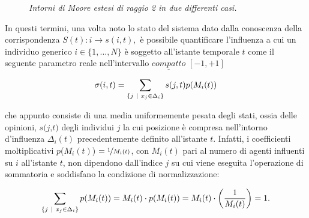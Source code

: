 \documentclass{article}
\begin{document}
\begin{figure}[h]
\centering
{}
\caption{\textit{Intorni di Moore estesi di raggio 2 in due differenti casi.}}
\label{fig:3}
\end{figure}

In questi termini, una volta noto lo stato del sistema dato dalla conoscenza della corrispondenza $S(t): i \rightarrow s(i,t), $ è possibile quantificare l'influenza a cui un individuo generico $\textit{i} \in \{1,...,\textit{N} \}$ è soggetto all'istante temporale $\textit{t}$ come il seguente parametro reale nell'intervallo $\underline{compatto}$ $[-1,+1]$

\begin{equation}
    \sigma(i,t) = \sum_{ \{ j \ | \ x_{j} \in \Delta_{i} \} } s(j, t)p(M_{i}(t))
    \medskip
    \label{Eq:1}
\end{equation}

che appunto consiste di una media uniformemente pesata degli stati, ossia delle opinioni, $\textit{s(j,t)}$ degli individui $\textit{j}$ la cui posizione è compresa nell'intorno d'influenza $\Delta_{i}(t)$ precedentemente definito all'istante $\textit{t}$. Infatti, i coefficienti moltiplicativi $\textit{p}$($M_{i}(t)$) $= \nicefrac{1}{M_{i}(t)}$, con $M_{i}(t)$ pari al numero di agenti influenti su $\textit{i}$ all'istante $\textit{t}$, non dipendono dall'indice $\textit{j}$ su cui viene eseguita l'operazione di sommatoria e soddisfano la condizione di normalizzazione:

\begin{equation}
    \sum_{ \{ j \ | \ x_{j} \in \Delta_{i} \} } p(M_{i}(t)) = M_{i}(t) \cdot p(M_{i}(t)) =    M_{i}(t) \cdot \left ( \frac{1}{M_{i}(t)} \right ) = 1.
    \medskip
    \label{Eq:2}
\end{equation}
\end{document}
